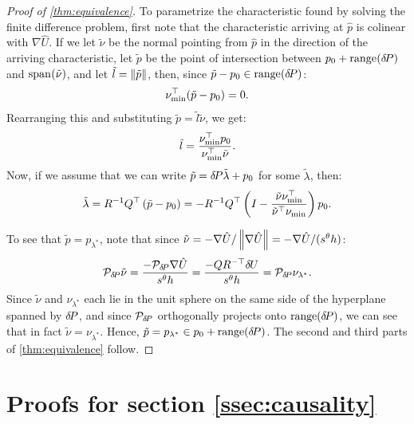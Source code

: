 \documentclass{article}
\begin{document}
\begin{proof}[Proof of \cref{thm:equivalence}]
  To parametrize the characteristic found by solving the finite
  difference problem, first note that the characteristic arriving at
  $\hat{p}$ is colinear with $\nabla \hat{U}$. If we let $\tilde{\nu}$
  be the normal pointing from $\hat{p}$ in the direction of the
  arriving characteristic, let $\tilde{p}$ be the point of
  intersection between
  $p_0 + \operatorname{range}\hspace{-0.15em}{({\delta \hspace{-0.14em} P})}$ and
  $\operatorname{span}\hspace{-0.15em}{(\tilde{\nu})}$, and let
  $\tilde{l} = \left\|\tilde{p}\right\|$, then, since
  $\tilde{p} - p_0 \in \operatorname{range}\hspace{-0.15em}{({\delta \hspace{-0.14em} P})}$:
  \begin{equation}
    \nu_{\operatorname{min}}^\top (\tilde{p} - p_0) = 0.
  \end{equation}
  Rearranging this and substituting
  $\tilde{p} = \tilde{l} \tilde{\nu}$, we get:
  \begin{equation}
    \tilde{l} = \frac{\nu_{\operatorname{min}}^\top p_0}{\nu_{\operatorname{min}}^\top \tilde{\nu}}.
  \end{equation}
  Now, if we assume that we can write
  $\tilde{p} = {\delta \hspace{-0.14em} P} \tilde{\lambda} + p_0$ for some
  $\tilde{\lambda}$, then:
  \begin{equation}
    \tilde{\lambda} = R^{-1} Q^\top \left(\tilde{p} - p_0\right) = -R^{-1} Q^\top \left(I - \frac{\tilde{\nu} \nu_{\operatorname{min}}^\top}{\tilde{\nu}^\top \nu_{\operatorname{min}}}\right) p_0.
  \end{equation}

  To see that $\tilde{p} = p_{\lambda^*}$, note that since
  $\tilde{\nu} = -\nabla \hat{U}/\left\|\nabla \hat{U}\right\| = -\nabla
  \hat{U}/(s^\theta h)$:
  \begin{equation}
    \mathcal{P}_{{\delta \hspace{-0.14em} P}} \tilde{\nu} = \frac{-\mathcal{P}_{{\delta \hspace{-0.14em} P}} \nabla \hat{U}}{s^\theta h} = \frac{-QR^{-\top} {\delta \hspace{-0.09em} U}}{s^\theta h} = \mathcal{P}_{{\delta \hspace{-0.14em} P}} \nu_{\lambda^*}.
  \end{equation}
  Since $\tilde{\nu}$ and $\nu_{\lambda^*}$ each lie in the unit
  sphere on the same side of the hyperplane spanned by ${\delta \hspace{-0.14em} P}$, and
  since $\mathcal{P}_{{\delta \hspace{-0.14em} P}}$ orthogonally projects onto
  $\operatorname{range}({\delta \hspace{-0.14em} P})$, we can see that in fact
  $\tilde{\nu} = \nu_{\lambda^*}$. Hence,
  $\tilde{p} = p_{\lambda^*} \in p_0 + \operatorname{range}({\delta \hspace{-0.14em} P})$. The second
  and third parts of \cref{thm:equivalence} follow.
\end{proof}

\section{Proofs for section \ref{ssec:causality}}\label{sec:causality-proofs}
\end{document}
